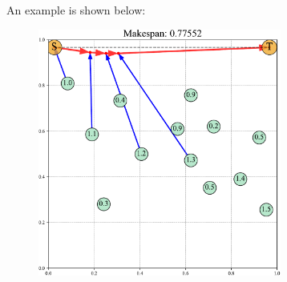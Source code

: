 \documentclass[10.0pt]{report}
\begin{document}
An example is shown below: 



\begin{figure}[H]
\centering
\includegraphics[width=8cm]{images/pho_example_plot.pdf}
\end{figure}
\end{document}
